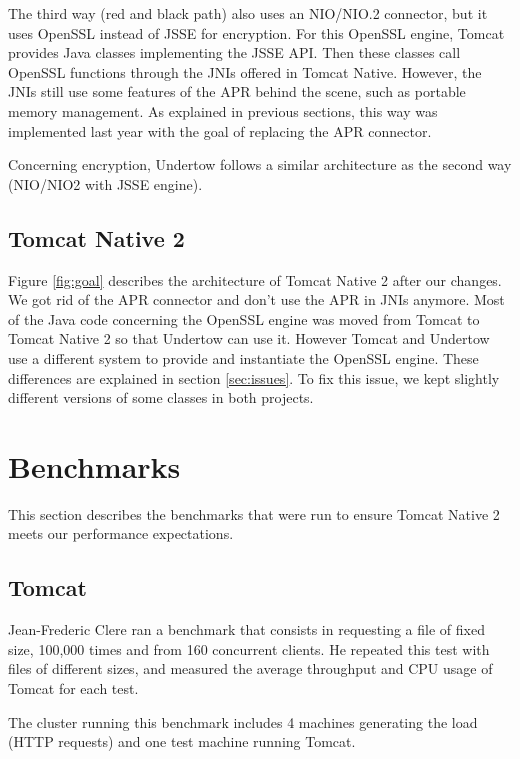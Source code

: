 \documentclass[11pt,a4paper,bibliography=totocnumbered]{scrartcl}
\def\mytitle{Tomcat Native 2}
\begin{document}
The third way (red and black path) also uses an NIO/NIO.2 connector, but it uses OpenSSL instead of JSSE for encryption. For this OpenSSL engine, Tomcat provides Java classes implementing the JSSE API. Then these classes call OpenSSL functions through the JNIs offered in Tomcat Native. However, the JNIs still use some features of the APR behind the scene, such as portable memory management. As explained in previous sections, this way was implemented last year with the goal of replacing the APR connector.

Concerning encryption, Undertow follows a similar architecture as the second way (NIO/NIO2 with JSSE engine).

\subsection{Tomcat Native 2}
Figure \ref{fig:goal} describes the architecture of \mytitle{} after our changes. We got rid of the APR connector and don't use the APR in JNIs anymore. Most of the Java code concerning the OpenSSL engine was moved from Tomcat to \mytitle{} so that Undertow can use it. However Tomcat and Undertow use a different system to provide and instantiate the OpenSSL engine. These differences are explained in section \ref{sec:issues}. To fix this issue, we kept slightly different versions of some classes in both projects.

\section{Benchmarks}
This section describes the benchmarks that were run to ensure \mytitle{} meets our performance expectations.
\subsection{Tomcat}
Jean-Frederic Clere ran a benchmark that consists in requesting a file of fixed size, 100,000 times and from 160 concurrent clients. He repeated this test with files of different sizes, and measured the average throughput and CPU usage of Tomcat for each test.

The cluster running this benchmark includes 4 machines generating the load (HTTP requests) and one test machine running Tomcat.
\end{document}
